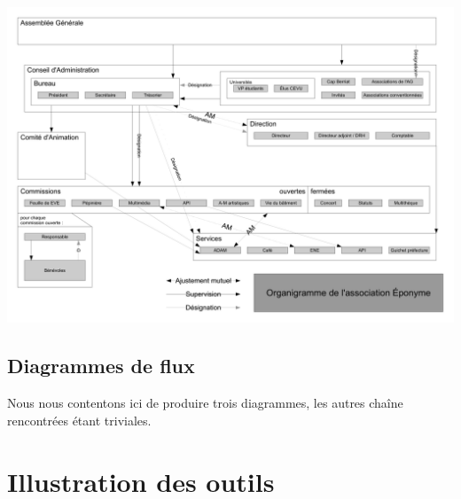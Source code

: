 \newpage

\includegraphics[trim=210mm 0mm 0mm 0mm,clip,scale=0.8]{annexes/organigramme.pdf}

\subsection{Diagrammes de flux}

Nous nous contentons ici de produire trois diagrammes, les autres chaîne
rencontrées étant triviales.



\section{Illustration des outils}

